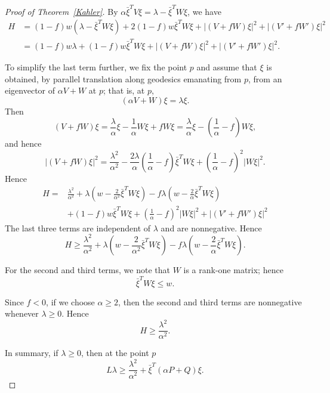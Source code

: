 \documentclass{amsart}
\theoremstyle{definition}
\theoremstyle{remark}
\numberwithin{equation}{section}
\begin{document}
\begin{proof}[Proof of Theorem~\ref{Kahler}]
By $\alpha \bar{\xi}^T V \xi=\lambda-\bar{\xi}^T W \xi$, we have
\begin{align}\label{H formula}
H & = (1-f) w\left(\lambda-\bar{\xi}^T W \xi\right)+2(1-f) w \bar{\xi}^T W \xi+|(V+f W) \xi|^2 + |(V'+f W') \xi|^2 \nonumber\\
& =(1-f) w \lambda+(1-f) w \bar{\xi}^T W \xi+|(V+f W) \xi|^2 + |(V'+f W') \xi|^2.
\end{align}


To simplify the last term further, we fix the point $p$ and assume that $\xi$ is obtained, by parallel translation along geodesics emanating from $p$, from an eigenvector of $\alpha V+W$ at $p$; that is, at $p$,
\[
(\alpha V+W) \xi=\lambda \xi.
\]
Then
\[
(V+f W) \xi=\frac{\lambda}{\alpha} \xi-\frac{1}{\alpha} W \xi+f W \xi=\frac{\lambda}{\alpha} \xi-\left(\frac{1}{\alpha}-f\right) W \xi,
\]
and hence
\[
|(V+f W) \xi|^2=\frac{\lambda^2}{\alpha^2}-\frac{2 \lambda}{\alpha}\left(\frac{1}{\alpha}-f\right) \bar{\xi}^T W \xi+\left(\frac{1}{\alpha}-f\right)^2|W \xi|^2.
\]
Hence
\[
  \begin{aligned}
  H=&\frac{\lambda^2}{\alpha^2}
    + \lambda\left(w-\frac{2}{\alpha^2} \bar{\xi}^T W \xi\right)
    -f \lambda\left(w-\frac{2}{\alpha} \bar{\xi}^T W \xi\right) \\
    &+(1-f) w \bar{\xi}^T W \xi
    +\left(\frac{1}{\alpha}-f\right)^2|W \xi|^2+|(V'+fW')\xi|^2
  \end{aligned}
\]
The last three terms are independent of $\lambda$ and are nonnegative. Hence
\begin{equation}\label{estimate H}
  H \geq \frac{\lambda^2}{\alpha^2}
    +\lambda\left(w-\frac{2}{\alpha^2} \bar{\xi}^T W \xi\right)
    -f \lambda\left(w-\frac{2}{\alpha} \bar{\xi}^T W \xi\right).
\end{equation}

For the second and third terms, we note that $W$ is a rank-one matrix; hence
\[
\bar{\xi}^T W \xi \leq w.
\]

Since $f<0$, if we choose $\alpha \geq 2$, then the second and third terms are nonnegative whenever $\lambda \geq 0$. Hence
\begin{equation}
  H \geq \frac{\lambda^2}{\alpha^2}.
\end{equation}

In summary, if $\lambda \geq 0$, then at the point $p$
\begin{equation}\label{L step 1}
  L \lambda \geq \frac{\lambda^2}{\alpha^2}+\bar{\xi}^T(\alpha P+Q) \xi.
\end{equation}


\end{proof}
\end{document}
